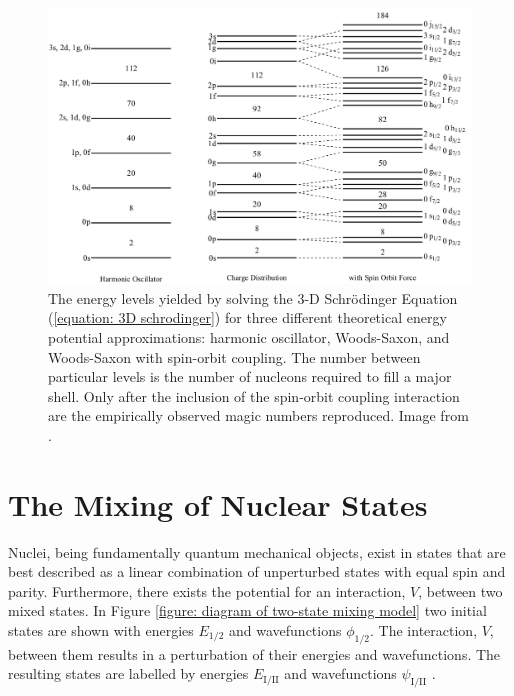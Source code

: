 \begin{figure}[!ht]
  \centering
  \includegraphics[width=\textwidth]{theory_schrodinger_energies.png}
  \caption[The energy levels yielded by solving the 3-D Schr\"odinger Equation (\ref{equation: 3D schrodinger}) for three different theoretical energy potential approximations: harmonic oscillator, Woods-Saxon, and Woods-Saxon with spin-orbit coupling.]{The energy levels yielded by solving the 3-D Schr\"odinger Equation (\ref{equation: 3D schrodinger}) for three different theoretical energy potential approximations: harmonic oscillator, Woods-Saxon, and Woods-Saxon with spin-orbit coupling. The number between particular levels is the number of nucleons required to fill a major shell. Only after the inclusion of the spin-orbit coupling interaction are the empirically observed magic numbers reproduced. Image from \cite{EvittsThesis}.}
  \label{figure: energy level solutions for three potentials}
\end{figure}

\section{The Mixing of Nuclear States}

Nuclei, being fundamentally quantum mechanical objects, exist in states that are best described as a linear combination of unperturbed states with equal spin and parity. Furthermore, there exists the potential for an interaction, $V$, between two mixed states. In Figure \ref{figure: diagram of two-state mixing model} two initial states are shown with energies $E_{1/2}$ and wavefunctions $\phi_{1/2}$. The interaction, $V$, between them results in a perturbation of their energies and wavefunctions. The resulting states are labelled by energies $E_{\mathrm{I/II}}$ and wavefunctions $\psi_{\mathrm{I/II}}$  \cite{KraneText}. 


